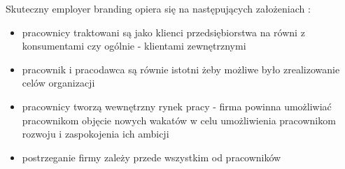 Skuteczny employer branding opiera się na następujących założeniach \cite{spychala-2019}:
\begin{itemize}
    \item pracownicy traktowani są jako klienci przedsiębiorstwa na równi z konsumentami czy ogólnie - klientami zewnętrznymi
    \item pracownik i pracodawca są równie istotni żeby możliwe było zrealizowanie celów organizacji
    \item pracownicy tworzą wewnętrzny rynek pracy - firma powinna umożliwiać pracownikom objęcie nowych wakatów w celu umożliwienia pracownikom rozwoju i zaspokojenia ich ambicji
    \item postrzeganie firmy zależy przede wszystkim od pracowników
\end{itemize}

